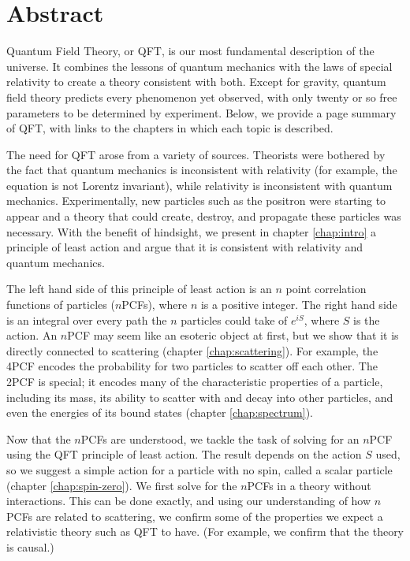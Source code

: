 \chapter{Abstract}

Quantum Field Theory, or QFT, is our most fundamental description of the universe. It combines the lessons of quantum mechanics with the laws of special relativity to create a theory consistent with both. Except for gravity, quantum field theory predicts every phenomenon yet observed, with only twenty or so free parameters to be determined by experiment. Below, we provide a  page summary of QFT, with links to the chapters in which each topic is described.

The need for QFT arose from a variety of sources. Theorists were bothered by the fact that quantum mechanics is inconsistent with relativity (for example, the \Schrodinger equation is not Lorentz invariant), while relativity is inconsistent with quantum mechanics. Experimentally, new particles such as the positron were starting to appear and a theory that could create, destroy, and propagate these particles was necessary. With the benefit of hindsight, we present in chapter \ref{chap:intro} a principle of least action and argue that it is consistent with relativity and quantum mechanics.

The left hand side of this principle of least action is an $n$ point correlation functions of particles ($n$PCFs), where $n$ is a positive integer. The right hand side is an integral over every path the $n$ particles could take of $e^{iS}$, where $S$ is the action. An $n$PCF may seem like an esoteric object at first, but we show that it is directly connected to scattering (chapter \ref{chap:scattering}). For example, the 4PCF encodes the probability for two particles to scatter off each other. The 2PCF is special; it encodes many of the characteristic properties of a particle, including its mass, its ability to scatter with and decay into other particles, and even the energies of its bound states (chapter \ref{chap:spectrum}).

Now that the $n$PCFs are understood, we tackle the task of solving for an $n$PCF using the QFT principle of least action. The result depends on the action $S$ used, so we suggest a simple action for a particle with no spin, called a scalar particle (chapter \ref{chap:spin-zero}). We first solve for the $n$PCFs in a theory without interactions. This can be done exactly, and using our understanding of how $n$PCFs are related to scattering, we confirm some of the properties we expect a relativistic theory such as QFT to have. (For example, we confirm that the theory is causal.)

